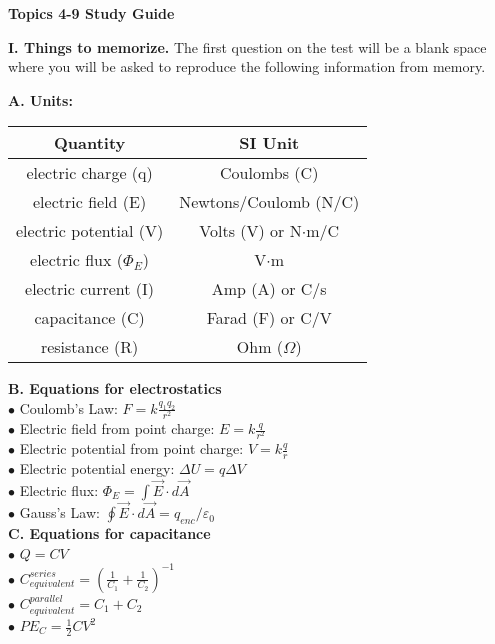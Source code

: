 \documentclass[11pt]{article}
\begin{document}
{\centering
\textbf{Topics 4-9 Study Guide} \par
\vspace{\baselineskip}
}

\textbf{I. Things to memorize.}
The first question on the test will be a blank space where you will be asked to reproduce the following information from memory.
\vspace{0.5\baselineskip}

\begin{addmargin}[1em]{0em}%
\textbf{A. Units:}

\vspace{0.25\baselineskip}
\begin{tabular}{ |c|c| } 
\hline
Quantity & SI Unit \\ 
\hline
electric charge (q) & Coulombs (C) \\ 
\hline
electric field (E) & Newtons/Coulomb (N/C) \\ 
\hline
electric potential (V) & Volts (V) or N$\cdot$m/C \\ 
\hline
electric flux ($\Phi_E$) & V$\cdot$m \\ 
\hline
electric current (I) & Amp (A) or C/s \\ 
\hline
capacitance (C) & Farad (F) or C/V \\ 
\hline
resistance (R) & Ohm ($\Omega$) \\ 
\hline
\end{tabular}
\vspace{0.75\baselineskip}

\textbf{B. Equations for electrostatics} \\
$\bullet$ Coulomb's Law: $F = k \frac{q_1 q_2}{r^2}$ \\
$\bullet$ Electric field from point charge: $E = k \frac{q}{r^2}$ \\
$\bullet$ Electric potential from point charge: $V = k \frac{q}{r}$ \\
$\bullet$ Electric potential energy: $\Delta U = q \Delta V$ \\
$\bullet$ Electric flux: $\Phi_E = \int \vec{E} \cdot d\vec{A}$ \\
$\bullet$ Gauss's Law: $\oint \vec{E} \cdot d\vec{A} = q_{enc}/\varepsilon_0$ \\

\textbf{C. Equations for capacitance} \\
$\bullet$ $Q = CV$ \\
$\bullet$ $C_{equivalent}^{series} = \left( \frac{1}{C_1} + \frac{1}{C_2} \right)^{-1}$ \\
$\bullet$ $C_{equivalent}^{parallel} = C_1 + C_2$ \\
$\bullet$ $PE_C = \frac{1}{2} C V^2$ \\


\end{addmargin}
\end{document}
